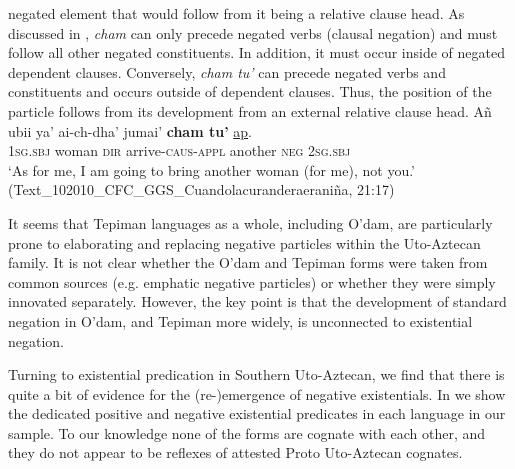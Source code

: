 \documentclass[output=paper,draft,draftmode,colorlinks,citecolor=brown]{langscibook}
\begin{document}
negated element that would follow from it being a relative clause head. As
discussed in , \emph{cham} can only precede negated verbs (clausal negation) and must follow all other negated constituents. In addition, it must occur inside of negated dependent clauses. Conversely, \emph{cham tu'} can precede negated verbs and constituents and occurs outside of dependent clauses. Thus, the position of the particle follows from its development from an external relative clause head.
\ea
\label{ex:odam-chamspec}
\gll Añ ubii ya’ ai-ch-dha’ jumai’ \textbf{cham tu’} \uline{ap}.\\
\textsc{1sg.sbj} woman \textsc{dir} arrive-\textsc{caus-appl} another \textsc{neg} \textsc{2sg.sbj}\\
\glt ‘As for me, I am going to bring another woman (for me), not you.’
(Text\_102010\_CFC\_GGS\_Cuandolacuranderaeraniña, 21:17)
\z

It seems that Tepiman languages as a whole, including O'dam, are particularly prone to elaborating and replacing negative particles within the Uto-Aztecan family. It is not clear whether the O'dam and Tepiman forms were taken from common sources (e.g. emphatic negative particles) or whether they were simply innovated separately. However, the key point is that the development of standard negation in O'dam, and Tepiman more widely, is unconnected to existential negation.

Turning to existential predication in Southern Uto-Aztecan, we find that
there is quite a bit of evidence for the (re-)emergence of negative
existentials. In  we show the dedicated positive and negative existential predicates in each language in our sample. To our knowledge none of the forms are cognate with each other, and they do not appear to be reflexes of attested Proto Uto-Aztecan cognates.
\end{document}
